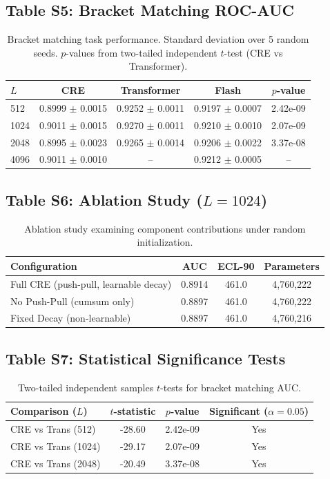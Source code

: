 \subsection*{Table S5: Bracket Matching ROC-AUC}
\begin{table}[h]
\centering
\begin{tabular}{lcccc}
\toprule
$L$ & CRE & Transformer & Flash & $p$-value \\
\midrule
512 & 0.8999 $\pm$ 0.0015 & 0.9252 $\pm$ 0.0011 & 0.9197 $\pm$ 0.0007 & 2.42e-09 \\
1024 & 0.9011 $\pm$ 0.0015 & 0.9270 $\pm$ 0.0011 & 0.9210 $\pm$ 0.0010 & 2.07e-09 \\
2048 & 0.8995 $\pm$ 0.0023 & 0.9265 $\pm$ 0.0014 & 0.9206 $\pm$ 0.0022 & 3.37e-08 \\
4096 & 0.9011 $\pm$ 0.0010 & -- & 0.9212 $\pm$ 0.0005 & -- \\
\bottomrule
\end{tabular}
\caption{Bracket matching task performance. Standard deviation over 5 random seeds. $p$-values from two-tailed independent $t$-test (CRE vs Transformer).}
\end{table}

\subsection*{Table S6: Ablation Study ($L=1024$)}
\begin{table}[h]
\centering
\begin{tabular}{lccc}
\toprule
Configuration & AUC & ECL-90 & Parameters \\
\midrule
Full CRE (push-pull, learnable decay) & 0.8914 & 461.0 & 4,760,222 \\
No Push-Pull (cumsum only) & 0.8897 & 461.0 & 4,760,222 \\
Fixed Decay (non-learnable) & 0.8897 & 461.0 & 4,760,216 \\
\bottomrule
\end{tabular}
\caption{Ablation study examining component contributions under random initialization.}
\end{table}

\subsection*{Table S7: Statistical Significance Tests}
\begin{table}[h]
\centering
\begin{tabular}{lccc}
\toprule
Comparison ($L$) & $t$-statistic & $p$-value & Significant ($\alpha=0.05$) \\
\midrule
CRE vs Trans (512) & -28.60 & 2.42e-09 & Yes \\
CRE vs Trans (1024) & -29.17 & 2.07e-09 & Yes \\
CRE vs Trans (2048) & -20.49 & 3.37e-08 & Yes \\
\bottomrule
\end{tabular}
\caption{Two-tailed independent samples $t$-tests for bracket matching AUC.}
\end{table}
